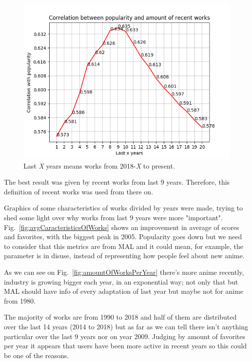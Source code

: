 \begin{figure}[!hbt]
	\begin{center}
	\includegraphics[width=\columnwidth]{graphics/correlationPopRecentWorks.png}
	\caption{Last \textit{X} years means works from 2018-\textit{X} to present.}
	\label{fig:correlationPopRecentWorks}
	\end{center}
\end{figure}

The best result was given by recent works from last 9 years. Therefore, this definition of recent works was used from there on.

Graphics of some characteristics of works divided by years were made, trying to shed some light over why works from last 9 years were more "important". Fig.~\ref{fig:avgCaracteristicsOfWorks} shows an improvement in average of scores and favorites, with the biggest peak in 2005. Popularity goes down but we need to consider that this metrics are from MAL and it could mean, for example, the parameter is in disuse, instead of representing how people feel about new anime.

As we can see on Fig.~\ref{fig:amountOfWorksPerYear} there's more anime recently, industry is growing bigger each year, in an exponential way; not only that but MAL should have info of every adaptation of last year but maybe not for anime from 1980.

The majority of works are from 1990 to 2018 and half of them are distributed over the last 14 years (2014 to 2018) but as far as we can tell there isn’t anything particular over the last 9 years nor on year 2009. Judging by amount of favorites per year it appears that users have been more active in recent years so this could be one of the reasons.


